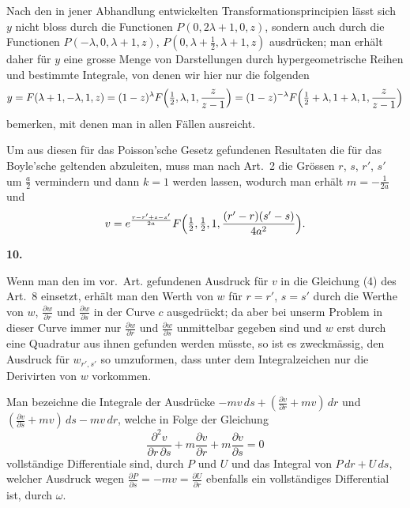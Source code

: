 \documentclass[12pt,a4paper]{book}
\theoremstyle{definition}
\theoremstyle{remark}
\begin{document}
Nach den in jener Abhandlung entwickelten Transformationsprincipien l\"asst sich $y$ nicht bloss durch die Functionen $P(0, 2\lambda+1, 0, z)$, sondern auch durch die Functionen $P(-\lambda, 0, \lambda+1, z)$, $P(0, \lambda+\frac{1}{2}, \lambda+1, z)$ ausdr\"ucken; man erh\"alt daher f\"ur $y$ eine grosse Menge von Darstellungen durch hypergeometrische Reihen und bestimmte Integrale, von denen wir hier nur die folgenden
\[
y = F(\lambda+1, -\lambda, 1, z) = (1-z)^{\lambda}F\Bigl(\tfrac{1}{2}, \lambda, 1, \frac{z}{z-1}\Bigr) = (1-z)^{-\lambda}F\Bigl(\tfrac{1}{2}+\lambda, 1+\lambda, 1, \frac{z}{z-1}\Bigr)
\]
bemerken, mit denen man in allen F\"allen ausreicht.

Um aus diesen f\"ur das Poisson'sche Gesetz gefundenen Resultaten die f\"ur das Boyle'sche geltenden abzuleiten, muss man nach Art.~2 die Gr\"ossen $r$, $s$, $r'$, $s'$ um $\frac{a}{2}$ vermindern und dann $k = 1$ werden lassen, wodurch man erh\"alt $m = -\frac{1}{2a}$ und
\[
v = e^{\frac{r-r'+s-s'}{2a}}F\Bigl(\tfrac{1}{2}, \tfrac{1}{2}, 1, \frac{(r'-r)(s'-s)}{4a^{2}}\Bigr).
\]

\newpage
\begin{center}
\textbf{10.}
\end{center}

Wenn man den im vor.~Art. gefundenen Ausdruck f\"ur $v$ in die Gleichung (4) des Art.~8 einsetzt, erh\"alt man den Werth von $w$ f\"ur $r = r'$, $s = s'$ durch die Werthe von $w$, $\frac{\partial w}{\partial r}$ und $\frac{\partial w}{\partial s}$ in der Curve $c$ ausgedr\"uckt; da aber bei unserm Problem in dieser Curve immer nur $\frac{\partial w}{\partial r}$ und $\frac{\partial w}{\partial s}$ unmittelbar gegeben sind und $w$ erst durch eine Quadratur aus ihnen gefunden werden m\"usste, so ist es zweckm\"assig, den Ausdruck f\"ur $w_{r',s'}$ so umzuformen, dass unter dem Integralzeichen nur die Derivirten von $w$ vorkommen.

Man bezeichne die Integrale der Ausdr\"ucke $-mv\,ds + (\frac{\partial v}{\partial r} + mv)\,dr$ und $(\frac{\partial v}{\partial s} + mv)\,ds - mv\,dr$, welche in Folge der Gleichung
\[
\frac{\partial^{2}v}{\partial r\,\partial s} + m\frac{\partial v}{\partial r} + m\frac{\partial v}{\partial s} = 0
\]
vollst\"andige Differentiale sind, durch $P$ und $U$ und das Integral von $P\,dr + U\,ds$, welcher Ausdruck wegen $\frac{\partial P}{\partial s} = -mv = \frac{\partial U}{\partial r}$ ebenfalls ein vollst\"andiges Differential ist, durch $\omega$.
\end{document}
